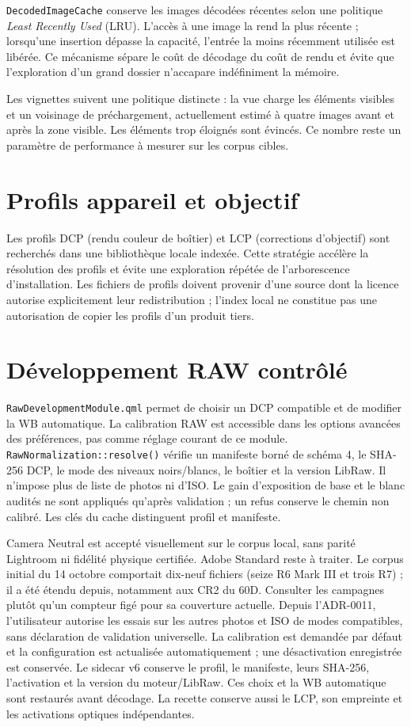 \texttt{DecodedImageCache} conserve les images décodées récentes selon une politique \emph{Least Recently Used} (LRU). L'accès à une image la rend la plus récente ; lorsqu'une insertion dépasse la capacité, l'entrée la moins récemment utilisée est libérée. Ce mécanisme sépare le coût de décodage du coût de rendu et évite que l'exploration d'un grand dossier n'accapare indéfiniment la mémoire.

Les vignettes suivent une politique distincte : la vue charge les éléments visibles et un voisinage de préchargement, actuellement estimé à quatre images avant et après la zone visible. Les éléments trop éloignés sont évincés. Ce nombre reste un paramètre de performance à mesurer sur les corpus cibles.

\section{Profils appareil et objectif}

Les profils DCP (rendu couleur de boîtier) et LCP (corrections d'objectif) sont recherchés dans une bibliothèque locale indexée. Cette stratégie accélère la résolution des profils et évite une exploration répétée de l'arborescence d'installation. Les fichiers de profils doivent provenir d'une source dont la licence autorise explicitement leur redistribution ; l'index local ne constitue pas une autorisation de copier les profils d'un produit tiers.

\section{Développement RAW contrôlé}

\texttt{RawDevelopmentModule.qml} permet de choisir un DCP compatible et de
modifier la WB automatique. La calibration RAW est accessible dans les options avancées des préférences, pas comme réglage courant de ce module.
\texttt{RawNormalization::resolve()} vérifie un manifeste borné de schéma 4,
le SHA-256 DCP, le mode des niveaux noirs/blancs, le boîtier et la version LibRaw.
Il n'impose plus de liste de photos ni d'ISO. Le gain d'exposition
de base et le blanc audités ne sont appliqués qu'après validation ; un refus
conserve le chemin non calibré. Les clés du cache distinguent profil et manifeste.

Camera Neutral est accepté visuellement sur le corpus local, sans parité
Lightroom ni fidélité physique certifiée. Adobe Standard reste à traiter.
Le corpus initial du 14 octobre comportait dix-neuf fichiers (seize R6 Mark III et trois R7) ; il a été étendu depuis, notamment aux CR2 du 60D. Consulter les campagnes plutôt qu'un compteur figé pour sa couverture actuelle.
Depuis l'ADR-0011, l'utilisateur autorise les essais sur les autres photos et ISO
de modes compatibles, sans déclaration de validation universelle. La calibration
est demandée par défaut et la configuration est actualisée automatiquement ;
une désactivation enregistrée est conservée. Le sidecar v6 conserve le profil,
le manifeste, leurs SHA-256, l'activation et la version du moteur/LibRaw.
Ces choix et la WB automatique sont restaurés avant décodage. La recette
conserve aussi le LCP, son empreinte et les activations optiques indépendantes.


